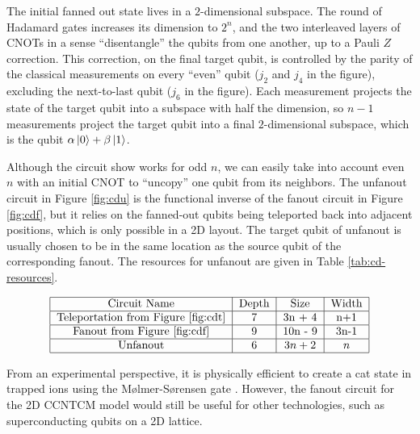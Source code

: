 \documentclass[twoside]{article}
\begin{document}
The initial fanned out state lives in a $2$-dimensional subspace. The
round of Hadamard gates increases its dimension to $2^n$, and the two
interleaved layers of CNOTs in a sense ``disentangle'' the qubits from
one another, up to a Pauli $Z$ correction. This correction, on the
final target qubit, is controlled by the parity of the classical measurements
on every ``even'' qubit ($j_2$ and $j_4$ in the figure), excluding the 
next-to-last qubit ($j_6$ in the figure). Each measurement projects the state of the
target qubit
into a subspace with half the dimension, so $n-1$ measurements project
the target qubit into a final $2$-dimensional subspace, which is the
qubit $\alpha\left\vert{0}\right\rangle + \beta\left\vert{1}\right\rangle$.

Although the circuit show works for odd $n$, we can easily take into
account even $n$ with an initial CNOT to ``uncopy'' one qubit from its
neighbors. The unfanout circuit in Figure \ref{fig:cdu} is the
functional inverse of the
fanout circuit in 
Figure \ref{fig:cdf}, but it relies on the fanned-out qubits
being teleported back into adjacent positions,
which is only possible in a 2D layout.
The target qubit of unfanout is usually chosen to be in the same location
as the source qubit of the corresponding fanout. 
The resources for unfanout are given in
Table \ref{tab:cd-resources}.

\begin{table}
\begin{displaymath}
\begin{tabular}{|c|c|c|c|}
\hline
\text{Circuit Name} & \text{Depth} & \text{Size} & \text{Width}\\
\hline
\text{Teleportation from Figure \ref{fig:cdt}} & 7 & 3n + 4 & n+1\\
\hline
\text{Fanout from Figure \ref{fig:cdf}} & 9 & 10n - 9 & 3n-1 \\
\hline
\text{Unfanout} & $ 6 $ & $ 3n+2 $ & $ n$ \\
\hline
\end{tabular}
\end{displaymath}
\centerline{}
\label{tab:cd-resources}
\end{table}

From an experimental perspective, it is physically efficient to create
a cat state in trapped ions using the M{\o}lmer-S{\o}rensen gate
\cite{Sorensen2000}\cite{Benhelm2008}. However, the fanout circuit for
the 2D CCNTCM model would still be useful for other technologies, such
as superconducting qubits on a 2D lattice.
\end{document}
